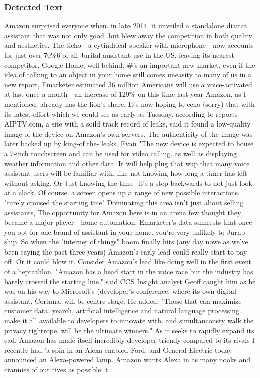 \subsubsection{Detected Text}
Amazon surprised everyone when. in late 2014. it unveiled a standalone diaitat assistant
that was not only good. but blew away the competition in both quality and aesthetics.
The ticho - a eytindrical speaker with microphone - now accounts for just over 70\%6 of all
Jurital ausistant use in the US, leaving its nearest competitor, Google Home, well behind.
\#'s an important new market, even if the idea of talking to an object in your home still
comes uneasity to many of us
in a new report, Emarketer estimated 36 million Americans will use a voice-activated
at last once a month - an increase of 129\% on this time last year
Amazon, as I mentioned. already has the lion's share, It's now hoping to echo (sorry) that
with its latest effort which we could see as early as Tuesday. according to reports
AIPTV.com, a site with a soild track record of leaks, said it found a low-quality image of the
device on Amazon's own servers.
The authenticity of the image was later backed up by king-of the- leaks. Evan
"The new device is expected to house a 7-inch touchscreen and can be used for video calling.
as well as displaying weather information and other data:
It will help plug that wap that many voice assistant users will be familiar with. like not
knowing how long a timer has left without asking. Or Just knowing the time -it's a step
backwards to not just look at a clack. Of course. a screen opens up a range of new possible
interactions.
"tarely croused the starting tine"
Dominating this area isn't just about selling assistants, The opportunity for Amazon here is
in an arena few thought they became a major player - home automation. Emarketer's data
sumrests that once you opt for one brand of assistant in your home. you're very unlikely to
Jurnp ship. So when the "internet of things" boom finally hits (any day nowe as we've been
saying the past three years) Amazon's early lead could really start to pay off.
Or it could blow it. Consider Amazon's lead like doing well in the first event of a heptathlon.
"Amazon has a head start in the vaice race but the industry has barely crossed the starting
line." said CCS Insight analyst Geoff caught him as he was on his way to Microsoft's
(developer's conference. where its own digital assistant, Cortana, will be centre stage:
He added: "Those that can maximize customer data, yearch, artificial intelligence and
natural language processing. make it all available to developers to innovate with. and
simultancousty walk the privacy tightrope. will be the ultimate winners."
As it seeks to rapidly expand its ead. Amazon has made itself incredibly developer-triendy
compared to its rivals I recently had 'a spin in an Alexa-enabled Ford. and General Electric
today announced an Alexa-powered lamp. Amazon wants Alexa in as many nooks and
crannies of our tives as possible.
t

